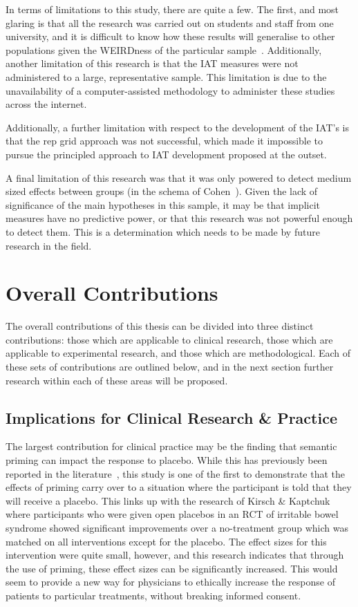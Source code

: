 In terms of limitations to this study, there are quite a few. The first, and most glaring is that all the research was carried out on students and staff from one university, and it is difficult to know how these results will generalise to other populations given the WEIRDness of the particular sample~\cite{henrich2010most}. Additionally, another limitation of this research is that the IAT measures were not administered to a large, representative  sample. This limitation is due to the unavailability of a computer-assisted methodology to administer these studies across the internet. 

Additionally, a further limitation with respect to the development of the IAT's is that the rep grid approach was not successful, which made it impossible to pursue the principled approach to IAT development proposed at the outset. 

A final limitation of this research was that it was only powered to detect medium sized effects between groups (in the schema of Cohen~\cite{cohen1988statistical}). Given the lack of significance of the main hypotheses in this sample, it may be that implicit measures have no predictive power, or that this research was not powerful enough to detect them. This is a determination which needs to be made by future research in the field. 


\section{Overall Contributions}
\label{sec:over-contr}

The overall contributions of this thesis can be divided into three distinct contributions: those which are applicable to clinical research, those which are applicable to experimental research, and those which are methodological. Each of these sets of contributions are outlined below, and in the next section further research within each of these areas will be proposed. 

\subsection{Implications for Clinical Research \& Practice}
\label{sec:impl-clin-rese}

The largest contribution for clinical practice may be the finding that semantic priming can impact the response to placebo. While this has previously been reported in the literature~\cite{Geers2005a,Jensen1991}, this study is one of the first to demonstrate that the effects of priming carry over to a situation where the participant is told that they will receive a placebo. This links up with the research of Kirsch \& Kaptchuk~\cite{kaptchuk2010placebos} where participants who were given open placebos in an RCT of irritable bowel syndrome showed significant improvements over a no-treatment group which was matched on all interventions except for the placebo. The effect sizes for this intervention were quite small, however, and this research indicates that through the use of priming, these effect sizes can be significantly increased. This would seem to provide a new way for physicians to ethically increase the response of patients to particular treatments, without breaking informed consent. 

